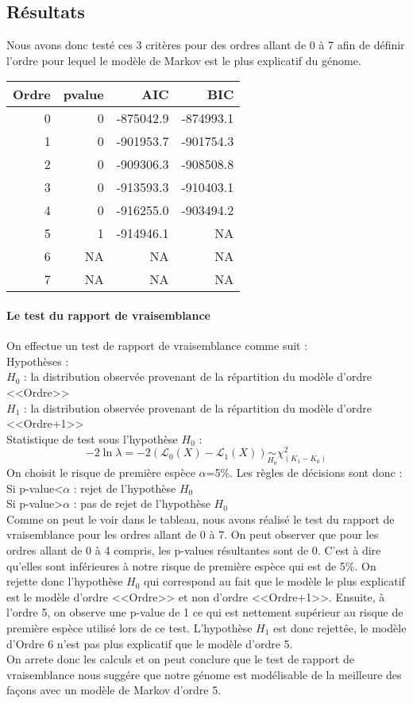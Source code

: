 \documentclass[12pt,a4paper]{article}
\begin{document}
\subsection{Résultats}
Nous avons donc testé ces 3 critères pour des ordres allant de 0 à 7 afin de définir l'ordre pour lequel le modèle de Markov est le plus explicatif du génome.
\begin{table}[!h]
\centering
\begin{tabular}{r|r|r|r}
\hline
Ordre & pvalue & AIC & BIC\\
\hline
0 & 0 & -875042.9 & -874993.1\\
1 & 0 & -901953.7 & -901754.3\\
2 & 0 & -909306.3 & -908508.8\\
3 & 0 & -913593.3 & -910403.1\\
4 & 0 & -916255.0 & -903494.2\\
5 & 1 & -914946.1 & NA\\
6 & NA & NA & NA\\
7 & NA & NA & NA\\
\hline
\end{tabular}
\end{table}
\paragraph{Le test du rapport de vraisemblance}
On effectue un test de rapport de vraisemblance comme suit : \\
Hypothèses :\\
$H_0$ : la distribution observée provenant de la répartition du modèle d'ordre <<Ordre>> \\
$H_1$ : la distribution observée provenant de la répartition du modèle d'ordre <<Ordre+1>> \\
Statistique de test sous l'hypothèse $H_0$ : 
\[
-2\ln\lambda = -2(\mathcal{L}_0(X)-\mathcal{L}_1(X)) \underset{H_0}{\sim}  \chi^{2}_{(K_1-K_0)}
\]
On choisit le risque de première espèce $\alpha$=5\%. Les règles de décisions sont donc :\\
Si p-value<$\alpha$ : rejet de l'hypothèse $H_0$ \\
Si p-value>$\alpha$ : pas de rejet de l'hypothèse $H_0$ \\

Comme on peut le voir dans le tableau, nous avons réalisé le test du rapport de vraisemblance pour les ordres allant de 0 à 7.
On peut observer que pour les ordres allant de 0 à 4 compris, les p-values résultantes sont de 0. C'est à dire qu'elles sont inférieures à notre risque de première espèce qui est de 5\%. On rejette donc l'hypothèse $H_0$ qui correspond au fait que le modèle le plus explicatif est le modèle d'ordre <<Ordre>> et non d'ordre <<Ordre+1>>. Ensuite, à l'ordre 5, on observe une p-value de 1 ce qui est nettement supérieur au risque de première espèce utilisé lors de ce test. L'hypothèse $H_1$ est donc rejettée, le modèle d'Ordre 6 n'est pas plus explicatif que le modèle d'ordre 5.
\\ \indent
On arrete donc les calculs et on peut conclure que le test de rapport de vraisemblance nous suggére que notre génome est modélisable de la meilleure des façons avec un modèle de Markov d'ordre 5.
\end{document}
